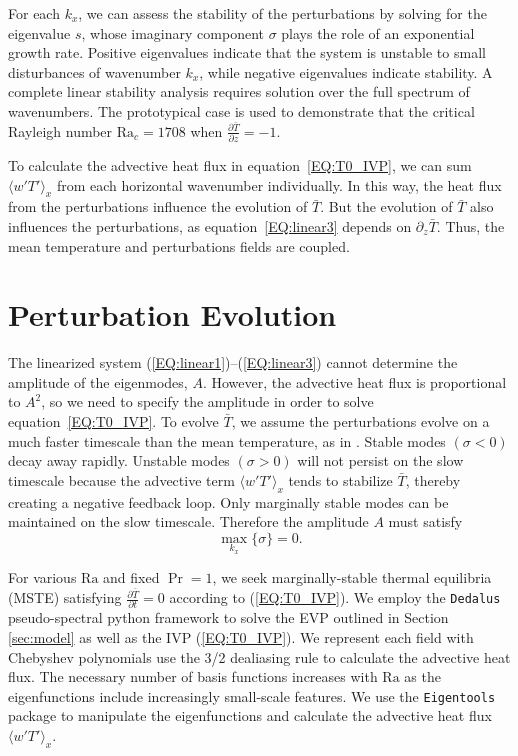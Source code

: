 \documentclass[reprint,amsmath,amssymb,aps]{revtex4-1}
\newcommand\Ra{\mathrm{Ra}}
\newcommand{\eq}[1]{(\ref{#1})}
\newcommand{\eqss}[2]{(\ref{#1})--(\ref{#2})}
\begin{document}
For each $k_x$, we can assess the stability of the perturbations by solving for the eigenvalue $s$, whose imaginary component $\sigma$ plays the role of an exponential growth rate. 
Positive eigenvalues indicate that the system is unstable to small disturbances of wavenumber $k_x$, while negative eigenvalues indicate stability. 
A complete linear stability analysis requires solution over the full spectrum of wavenumbers. 
The prototypical case is used to demonstrate that the critical Rayleigh number $\Ra_c = 1708$ when $\frac{\partial \bar{T}}{\partial z} = -1$.

To calculate the advective heat flux in equation~\ref{EQ:T0_IVP}, we can sum $\langle w'T' \rangle_x$ from each horizontal wavenumber individually.
In this way, the heat flux from the perturbations influence the evolution of $\bar{T}$.
But the evolution of $\bar{T}$ also influences the perturbations, as equation~\ref{EQ:linear3} depends on $\partial_z \bar{T}$.
Thus, the mean temperature and perturbations fields are coupled.

\section{Perturbation Evolution}\label{sec:evolution}
The linearized system \eqss{EQ:linear1}{EQ:linear3} cannot determine the amplitude of the eigenmodes, $A$.
However, the advective heat flux is proportional to $A^2$, so we need to specify the amplitude in order to solve equation~\ref{EQ:T0_IVP}.
To evolve $\bar{T}$, we assume the perturbations evolve on a much faster timescale than the mean temperature, as in \cite{michel_chini_2019}.
Stable modes $(\sigma < 0)$ decay away rapidly. 
Unstable modes $(\sigma > 0)$ will not persist on the slow timescale because the advective term $\langle w'T' \rangle_x$ tends to stabilize $\bar{T}$, thereby creating a negative feedback loop.
Only marginally stable modes can be maintained on the slow timescale.
Therefore the amplitude $A$ must satisfy
\begin{equation}
    \max_{k_x} \{ \sigma \} = 0.
\end{equation}

For various $\Ra$ and fixed $\Pr = 1$, we seek marginally-stable thermal equilibria (MSTE) satisfying $\frac{\partial \bar{T}}{\partial t} = 0$ according to \eq{EQ:T0_IVP}. 
We employ the \texttt{Dedalus} pseudo-spectral python framework \cite{Dedalus_2020} to solve the EVP outlined in Section \ref{sec:model} as well as the IVP \eq{EQ:T0_IVP}.
We represent each field with Chebyshev polynomials use the 3/2 dealiasing rule to calculate the advective heat flux.
The necessary number of basis functions increases with $\Ra$ as the eigenfunctions include increasingly small-scale features. 
We use the \texttt{Eigentools} package \cite{Eigentools} to manipulate the eigenfunctions and calculate the advective heat flux $\langle w' T' \rangle_x$.
\end{document}
